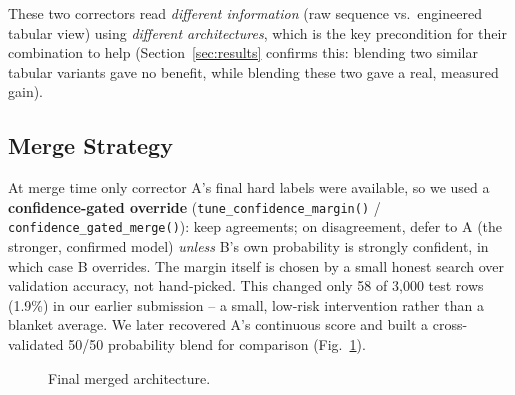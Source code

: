 \documentclass[10pt,twocolumn]{article}
\begin{document}
These two correctors read \emph{different information} (raw sequence vs.\ engineered tabular view) using \emph{different architectures}, which is the key precondition for their combination to help (Section~\ref{sec:results} confirms this: blending two similar tabular variants gave no benefit, while blending these two gave a real, measured gain).

\subsection{Merge Strategy}
\label{sec:merge}
At merge time only corrector A's final hard labels were available, so we used a \textbf{confidence-gated override} (\texttt{tune\_confidence\_margin()} / \texttt{confidence\_gated\_merge()}): keep agreements; on disagreement, defer to A (the stronger, confirmed model) \emph{unless} B's own probability is strongly confident, in which case B overrides. The margin itself is chosen by a small honest search over validation accuracy, not hand-picked. This changed only 58 of 3{,}000 test rows (1.9\%) in our earlier submission -- a small, low-risk intervention rather than a blanket average. We later recovered A's continuous score and built a cross-validated 50/50 probability blend for comparison (Fig.~\ref{fig:blockdiag}).

\begin{figure}[!htb]
\centering
{}
\caption{Final merged architecture.}
\label{fig:blockdiag}
\end{figure}
\end{document}
